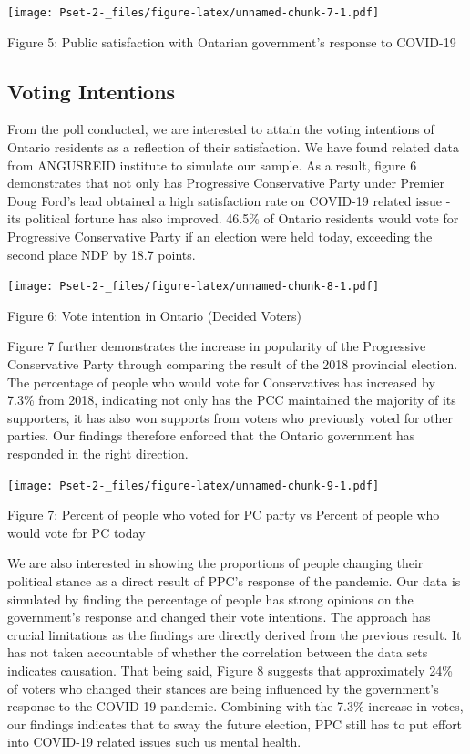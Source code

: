 \documentclass[
]{article}
\begin{document}
\texttt{[image: Pset-2-\_files/figure-latex/unnamed-chunk-7-1.pdf]}

Figure 5: Public satisfaction with Ontarian government's response to
COVID-19

\hypertarget{voting-intentions}{%
\subsection{Voting Intentions}\label{voting-intentions}}

From the poll conducted, we are interested to attain the voting
intentions of Ontario residents as a reflection of their satisfaction.
We have found related data from ANGUSREID institute to simulate our
sample. As a result, figure 6 demonstrates that not only has Progressive
Conservative Party under Premier Doug Ford's lead obtained a high
satisfaction rate on COVID-19 related issue - its political fortune has
also improved. 46.5\% of Ontario residents would vote for Progressive
Conservative Party if an election were held today, exceeding the second
place NDP by 18.7 points.

\texttt{[image: Pset-2-\_files/figure-latex/unnamed-chunk-8-1.pdf]}

Figure 6: Vote intention in Ontario (Decided Voters)

Figure 7 further demonstrates the increase in popularity of the
Progressive Conservative Party through comparing the result of the 2018
provincial election. The percentage of people who would vote for
Conservatives has increased by 7.3\% from 2018, indicating not only has
the PCC maintained the majority of its supporters, it has also won
supports from voters who previously voted for other parties. Our
findings therefore enforced that the Ontario government has responded in
the right direction.

\texttt{[image: Pset-2-\_files/figure-latex/unnamed-chunk-9-1.pdf]}

Figure 7: Percent of people who voted for PC party vs Percent of people
who would vote for PC today

We are also interested in showing the proportions of people changing
their political stance as a direct result of PPC's response of the
pandemic. Our data is simulated by finding the percentage of people has
strong opinions on the government's response and changed their vote
intentions. The approach has crucial limitations as the findings are
directly derived from the previous result. It has not taken accountable
of whether the correlation between the data sets indicates causation.
That being said, Figure 8 suggests that approximately 24\% of voters who
changed their stances are being influenced by the government's response
to the COVID-19 pandemic. Combining with the 7.3\% increase in votes,
our findings indicates that to sway the future election, PPC still has
to put effort into COVID-19 related issues such us mental health.
\end{document}
